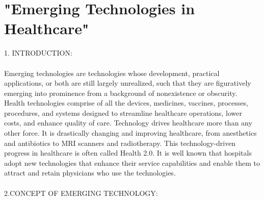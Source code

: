 \documentclass{article}
\begin{document}
\section{"Emerging Technologies in Healthcare"} 

1. INTRODUCTION:\\ 
\\
Emerging technologies are technologies whose development, practical applications, or both are still largely unrealized, such that they are figuratively emerging into prominence from a background of nonexistence or obscurity.\\

Health technologies comprise of all the devices, medicines, vaccines, processes, procedures, and systems designed to streamline 
healthcare operations, lower costs, and enhance quality of care. Technology drives healthcare more than any other force. It is 
drastically changing and improving healthcare, from anesthetics and antibiotics to MRI scanners and radiotherapy. This 
technology-driven progress in healthcare is often called Health 2.0. It is well known that hospitals adopt new technologies that 
enhance their service capabilities and enable them to attract and retain physicians who use the technologies.
\\
\\
2.CONCEPT OF EMERGING TECHNOLOGY:\\
\end{document}
